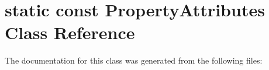 \hypertarget{classstatic_01const_01PropertyAttributes}{}\section{static const Property\+Attributes Class Reference}
\label{classstatic_01const_01PropertyAttributes}


The documentation for this class was generated from the following files\+: